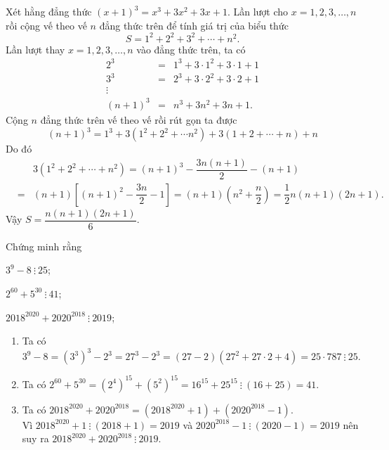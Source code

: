 \begin{vn}
	Xét hằng đẳng thức $(x+1)^3 = x^3 + 3x^2 + 3x + 1$. Lần lượt cho $x = 1,2,3, \ldots, n$ rồi cộng vế theo vế $n$ đẳng thức trên để tính giá trị của biểu thức
	\[S = 1^2 + 2^2 + 3^2 + \cdots + n^2.\]
	\loigiai 
	{
		Lần lượt thay $x = 1,2,3, \ldots, n$ vào đẳng thức trên, ta có
		{\allowdisplaybreaks
		\begin{eqnarray*}
			2^3 &=& 1^3 + 3 \cdot 1^2 + 3 \cdot 1 + 1 \\
			3^3 &=& 2^3 + 3 \cdot 2^2 + 3 \cdot 2 + 1 \\
			\vdots  \\
			(n+1)^3 &=& n^3 + 3n^2 + 3n + 1.
		\end{eqnarray*}
		}
		Cộng $n$ đẳng thức trên vế theo vế rồi rút gọn ta được
		\[(n+1)^3 = 1^3 + 3 \left(1^2 + 2^2 + \cdots n^2\right) + 3(1+2+ \cdots + n) + n\]
		Do đó
		{\allowdisplaybreaks
		\begin{eqnarray*}
			&& 3\left(1^2 + 2^2 + \cdots + n^2\right) = (n+1)^3 - \dfrac{3n(n+1)}{2} - (n+1) \\
			&=& (n+1) \left[(n+1)^2 - \dfrac{3n}{2} - 1\right] = (n+1) \left(n^2 + \dfrac{n}{2}\right) = \dfrac{1}{2}n(n+1)(2n+1).
		\end{eqnarray*}
		}
		Vậy $S = \dfrac{n(n+1)(2n+1)}{6}$.
	}
\end{vn}

\begin{vn}
	Chứng minh rằng 
	\begin{listEX}[3]
		\item $3^9 - 8 \ \vdots \ 25$;
		\item $2^{60} + 5^{30} \ \vdots \ 41$;
		\item $2018^{2020} + 2020^{2018} \ \vdots \ 2019$;
	\end{listEX}
	\loigiai 
	{
		\begin{enumerate}
			\item Ta có $3^9 - 8 = \left(3^3\right)^3 - 2^3 = 27^3 - 2^3 = (27 - 2)\left(27^2 + 27 \cdot 2 + 4\right) = 25 \cdot 787 \ \vdots \ 25.$
			\item Ta có $2^{60} + 5^{30} = \left(2^4\right)^{15} + \left(5^2\right)^{15} = 16^{15} + 25^{15} \ \vdots \ (16+25) = 41$.
			\item Ta có $2018^{2020} + 2020^{2018} = \left(2018^{2020} + 1\right) + \left(2020^{2018} - 1\right)$.\\
			Vì $2018^{2020} + 1 \ \vdots \ (2018+1) = 2019$ và $2020^{2018} - 1 \ \vdots \ (2020 - 1) = 2019$ nên suy ra $2018^{2020} + 2020^{2018} \ \vdots \ 2019$.
		\end{enumerate}
	}
\end{vn}

